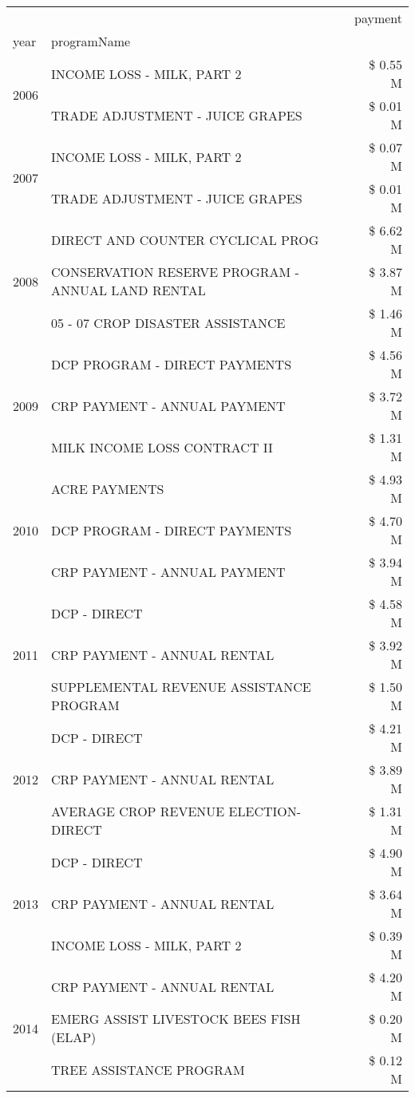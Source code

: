 \begin{tabular}{llr}
\toprule
 &  & payment \\
year & programName &  \\
\midrule
\multirow[t]{2}{*}{2006} & INCOME LOSS - MILK, PART 2 & \$ 0.55 M \\
 & TRADE ADJUSTMENT - JUICE GRAPES & \$ 0.01 M \\
\cline{1-3}
\multirow[t]{2}{*}{2007} & INCOME LOSS - MILK, PART 2 & \$ 0.07 M \\
 & TRADE ADJUSTMENT - JUICE GRAPES & \$ 0.01 M \\
\cline{1-3}
\multirow[t]{3}{*}{2008} & DIRECT AND COUNTER CYCLICAL PROG & \$ 6.62 M \\
 & CONSERVATION RESERVE PROGRAM - ANNUAL LAND RENTAL & \$ 3.87 M \\
 & 05 - 07 CROP DISASTER ASSISTANCE & \$ 1.46 M \\
\cline{1-3}
\multirow[t]{3}{*}{2009} & DCP PROGRAM - DIRECT PAYMENTS & \$ 4.56 M \\
 & CRP PAYMENT - ANNUAL PAYMENT & \$ 3.72 M \\
 & MILK INCOME LOSS CONTRACT II & \$ 1.31 M \\
\cline{1-3}
\multirow[t]{3}{*}{2010} & ACRE PAYMENTS & \$ 4.93 M \\
 & DCP PROGRAM - DIRECT PAYMENTS & \$ 4.70 M \\
 & CRP PAYMENT - ANNUAL PAYMENT & \$ 3.94 M \\
\cline{1-3}
\multirow[t]{3}{*}{2011} & DCP - DIRECT & \$ 4.58 M \\
 & CRP PAYMENT - ANNUAL RENTAL & \$ 3.92 M \\
 & SUPPLEMENTAL REVENUE ASSISTANCE PROGRAM & \$ 1.50 M \\
\cline{1-3}
\multirow[t]{3}{*}{2012} & DCP - DIRECT & \$ 4.21 M \\
 & CRP PAYMENT - ANNUAL RENTAL & \$ 3.89 M \\
 & AVERAGE CROP REVENUE ELECTION-DIRECT & \$ 1.31 M \\
\cline{1-3}
\multirow[t]{3}{*}{2013} & DCP - DIRECT & \$ 4.90 M \\
 & CRP PAYMENT - ANNUAL RENTAL & \$ 3.64 M \\
 & INCOME LOSS - MILK, PART 2 & \$ 0.39 M \\
\cline{1-3}
\multirow[t]{3}{*}{2014} & CRP PAYMENT - ANNUAL RENTAL & \$ 4.20 M \\
 & EMERG ASSIST LIVESTOCK BEES FISH (ELAP) & \$ 0.20 M \\
 & TREE ASSISTANCE PROGRAM & \$ 0.12 M \\

\end{tabular}
